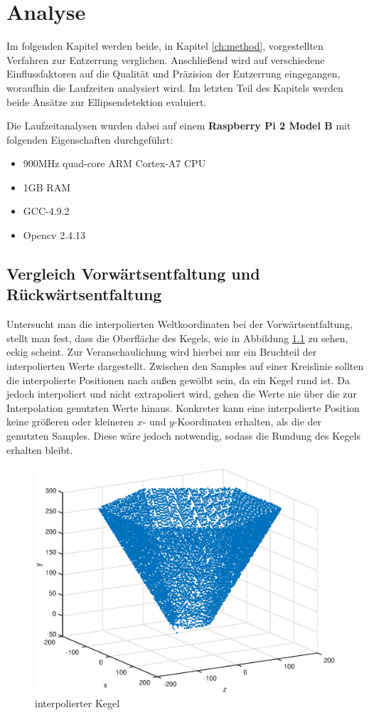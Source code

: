 \chapter{Analyse}
\label{ch:analysis}

Im folgenden Kapitel werden beide, in Kapitel \ref{ch:method}, vorgestellten Verfahren zur Entzerrung verglichen. Anschließend wird auf verschiedene Einflussfaktoren auf die Qualität und Präzision der Entzerrung eingegangen, woraufhin die Laufzeiten analysiert wird. Im letzten Teil des Kapitels werden beide Ansätze zur Ellipsendetektion evaluiert.


Die Laufzeitanalysen wurden dabei auf einem \textbf{Raspberry Pi 2 Model B} mit folgenden Eigenschaften durchgeführt:
\begin{itemize}
	\item 900MHz quad-core ARM Cortex-A7 CPU
	\item 1GB RAM
	\item GCC-4.9.2
	\item Opencv 2.4.13
\end{itemize}


\section{Vergleich Vorwärtsentfaltung und Rückwärtsentfaltung}
Untersucht man die interpolierten Weltkoordinaten bei der Vorwärtsentfaltung, stellt man fest, dass die Oberfläche des Kegels,  wie in Abbildung \ref{fig:3DInterpol} zu sehen, eckig scheint. Zur Veranschaulichung wird hierbei nur ein Bruchteil der interpolierten Werte dargestellt. Zwischen den Samples auf einer Kreislinie sollten die interpolierte Positionen nach außen gewölbt sein, da ein Kegel rund ist. Da jedoch interpoliert und nicht extrapoliert wird, gehen die Werte nie über die zur Interpolation genutzten Werte hinaus. Konkreter kann eine interpolierte Position keine größeren oder kleineren $x$- und $y$-Koordinaten erhalten, als die der genutzten Samples. Diese wäre jedoch notwendig, sodass die Rundung des Kegels erhalten bleibt.

\begin{figure}[!htb]
	\centering
	\includegraphics[scale=.7]{images/3d_interpol.eps}
	\caption{interpolierter Kegel}
	\label{fig:3DInterpol}
\end{figure}

